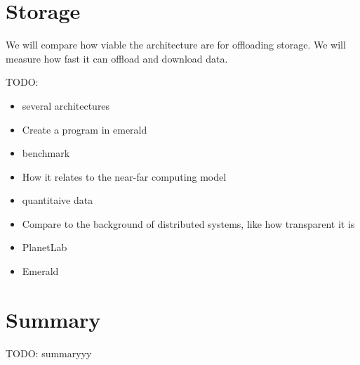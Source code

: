 \section{Storage}
We will compare how viable the architecture are for offloading storage. We will measure how fast it can offload and download data.



\bigskip
TODO:
\begin{itemize}
    \item several architectures  
    \item Create a program in emerald  
    \item benchmark  
    \item How it relates to the near-far computing model  
    \item quantitaive data  
    \item Compare to the background of distributed systems, like how transparent it is  
    \item PlanetLab  
    \item Emerald  
\end{itemize}




\section{Summary}
TODO: summaryyy



